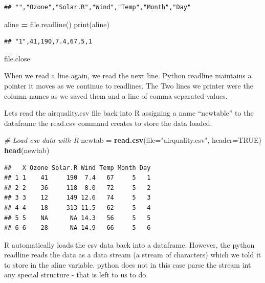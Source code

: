 \documentclass[]{book}
\newenvironment{Shaded}{\begin{snugshade}}{\end{snugshade}}
\newcommand{\KeywordTok}[1]{\textcolor[rgb]{0.13,0.29,0.53}{\textbf{#1}}}
\newcommand{\DataTypeTok}[1]{\textcolor[rgb]{0.13,0.29,0.53}{#1}}
\newcommand{\StringTok}[1]{\textcolor[rgb]{0.31,0.60,0.02}{#1}}
\newcommand{\CommentTok}[1]{\textcolor[rgb]{0.56,0.35,0.01}{\textit{#1}}}
\newcommand{\OtherTok}[1]{\textcolor[rgb]{0.56,0.35,0.01}{#1}}
\newcommand{\OperatorTok}[1]{\textcolor[rgb]{0.81,0.36,0.00}{\textbf{#1}}}
\newcommand{\BuiltInTok}[1]{#1}
\newcommand{\NormalTok}[1]{#1}
\theoremstyle{definition}
\theoremstyle{definition}
\theoremstyle{definition}
\theoremstyle{remark}
\begin{document}
\begin{verbatim}
## "","Ozone","Solar.R","Wind","Temp","Month","Day"
\end{verbatim}

\begin{Shaded}
\begin{Highlighting}[]
\NormalTok{aline }\OperatorTok{=} \BuiltInTok{file}\NormalTok{.readline()}
\BuiltInTok{print}\NormalTok{(aline)}
\end{Highlighting}
\end{Shaded}

\begin{verbatim}
## "1",41,190,7.4,67,5,1
\end{verbatim}

\begin{Shaded}
\begin{Highlighting}[]
\BuiltInTok{file}\NormalTok{.close}
\end{Highlighting}
\end{Shaded}

When we read a line again, we read the next line. Python readline
maintains a pointer it moves as we continue to readlines. The Two lines
we printer were the column names as we saved them and a line of comma
separated values.

Lets read the airquality.csv file back into R assigning a name
``newtable'' to the dataframe the read.csv command creates to store the
data loaded.

\begin{Shaded}
\begin{Highlighting}[]
\CommentTok{# Load csv data with R}
\NormalTok{newtab =}\StringTok{ }\KeywordTok{read.csv}\NormalTok{(}\DataTypeTok{file=}\StringTok{"airquality.csv"}\NormalTok{, }\DataTypeTok{header=}\OtherTok{TRUE}\NormalTok{)}
\KeywordTok{head}\NormalTok{(newtab)}
\end{Highlighting}
\end{Shaded}

\begin{verbatim}
##   X Ozone Solar.R Wind Temp Month Day
## 1 1    41     190  7.4   67     5   1
## 2 2    36     118  8.0   72     5   2
## 3 3    12     149 12.6   74     5   3
## 4 4    18     313 11.5   62     5   4
## 5 5    NA      NA 14.3   56     5   5
## 6 6    28      NA 14.9   66     5   6
\end{verbatim}

R automatically loads the csv data back into a dataframe. However, the
python readline reads the data as a data stream (a stream of characters)
which we told it to store in the aline variable. python does not in this
case parse the stream int any special structure - that is left to us to
do.
\end{document}
